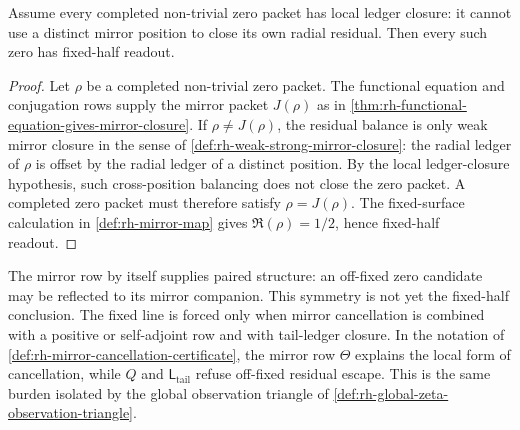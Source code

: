 \begin{theorem}
\label{thm:rh-local-zero-ledger-closure-fixed-half-readout}
Assume every completed non-trivial zero packet has local ledger closure:
it cannot use a distinct mirror position to close its own radial
residual.  Then every such zero has fixed-half readout.
\end{theorem}

\begin{proof}
Let $\rho$ be a completed non-trivial zero packet.  The functional
equation and conjugation rows supply the mirror packet $J(\rho)$ as in
\autoref{thm:rh-functional-equation-gives-mirror-closure}.  If
$\rho\ne J(\rho)$, the residual balance is only weak mirror closure in
the sense of \autoref{def:rh-weak-strong-mirror-closure}: the radial
ledger of $\rho$ is offset by the radial ledger of a distinct position.
By the local ledger-closure hypothesis, such cross-position balancing
does not close the zero packet.  A completed zero packet must therefore
satisfy $\rho=J(\rho)$.  The fixed-surface calculation in
\autoref{def:rh-mirror-map} gives $\Re(\rho)=1/2$, hence fixed-half
readout.
\end{proof}

\begin{principle}
\label{prin:rh-mirror-symmetry-positivity-locks-line}
The mirror row by itself supplies paired structure: an off-fixed zero
candidate may be reflected to its mirror companion.  This symmetry is
not yet the fixed-half conclusion.  The fixed line is forced only when
mirror cancellation is combined with a positive or self-adjoint row and
with tail-ledger closure.  In the notation of
\autoref{def:rh-mirror-cancellation-certificate}, the mirror row
$\Theta$ explains the local form of cancellation, while $Q$ and
$\mathsf L_{\mathrm{tail}}$ refuse off-fixed residual escape.  This is
the same burden isolated by the global observation triangle of
\autoref{def:rh-global-zeta-observation-triangle}.
\end{principle}
